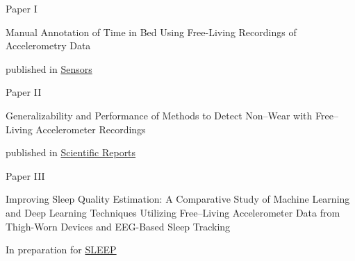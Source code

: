 \begin{center}

Paper I

\textsf{Manual Annotation of Time in Bed Using Free-Living Recordings of Accelerometry Data}

published in \href{https://doi.org/10.3390/s21248442}{Sensors}

\vspace{2cm}
Paper II

\textsf{Generalizability and Performance of Methods to Detect Non–Wear with Free–Living Accelerometer Recordings}

published in \href{https://doi.org/10.1038/s41598-023-29666-x}{Scientific Reports}

\vspace{2cm}
Paper III 

\textsf{Improving Sleep Quality Estimation: A Comparative Study of Machine Learning and Deep Learning Techniques Utilizing Free–Living Accelerometer Data from Thigh-Worn Devices and EEG-Based Sleep Tracking}

In preparation for \href{https://academic.oup.com/sleep}{SLEEP}

\end{center}
